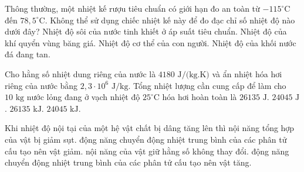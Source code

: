 \begin{ex}%
	Thông thường, một nhiệt kế rượu tiêu chuẩn có giới hạn đo an toàn từ $-115^\circ\text{C}$ đến $78,5^\circ\text{C}$. Không thể sử dụng chiếc nhiệt kế này để đo đạc chỉ số nhiệt độ nào dưới đây?
	\choice
	{\True Nhiệt độ sôi của nước tinh khiết ở áp suất tiêu chuẩn.}
	{Nhiệt độ của khí quyển vùng băng giá.}
	{Nhiệt độ cơ thể của con người.}
	{Nhiệt độ của khối nước đá đang tan.}
\end{ex}

\begin{ex}%
	Cho hằng số nhiệt dung riêng của nước là $4180\text{ J/(kg.K)}$ và ẩn nhiệt hóa hơi riêng của nước bằng $2,3 \cdot 10^6\text{ J/kg}$. Tổng nhiệt lượng cần cung cấp để làm cho $10\text{ kg}$ nước lỏng đang ở vạch nhiệt độ $25^\circ\text{C}$ hóa hơi hoàn toàn là
	\choice
	{$26135\text{ J}$.}
	{$24045\text{ J}$.}
	{\True $26135\text{ kJ}$.}
	{$24045\text{ kJ}$.}
\end{ex}

\begin{ex}%
	Khi nhiệt độ nội tại của một hệ vật chất bị dâng tăng lên thì
	\choice
	{nội năng tổng hợp của vật bị giảm sụt.}
	{động năng chuyển động nhiệt trung bình của các phân tử cấu tạo nên vật giảm.}
	{nội năng của vật giữ hằng số không thay đổi.}
	{\True động năng chuyển động nhiệt trung bình của các phân tử cấu tạo nên vật tăng.}
\end{ex}

